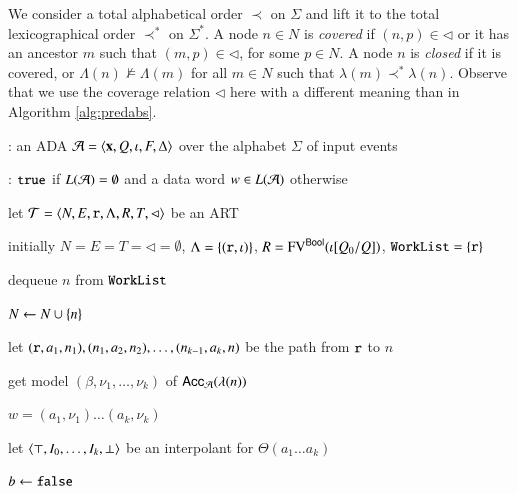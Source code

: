 \documentclass[10pt,conference,letterpaper,twocolumn]{IEEEtran}
\begin{document}
We consider a total alphabetical order $\prec$ on $\Sigma$ and lift it
to the total lexicographical order $\prec^*$ on $\Sigma^*$. A node $n
\in N$ is \emph{covered} if $(n,p) \in \lhd$ or it has an ancestor $m$
such that $(m,p) \in \lhd$, for some $p \in N$. A node $n$ is
\emph{closed} if it is covered, or $\Lambda(n) \not\models \Lambda(m)$
for all $m \in N$ such that $\lambda(m) \prec^* \lambda(n)$. Observe
that we use the coverage relation $\lhd$ here with a different meaning
than in Algorithm \ref{alg:predabs}.

\begin{algorithm}[t!]
{\scriptsize\begin{algorithmic}[0]
  : an ADA $\mathcal{A} = \left\langle \mathbf x,Q,\iota,F,\Delta \right\rangle$
  over the alphabet $\Sigma$ of input events

  : $\mathtt{true}$ if $L(\mathcal{A})=\emptyset$ and a data word $w
  \in L(\mathcal{A})$ otherwise
\end{algorithmic}}

{\scriptsize\begin{algorithmic}[1] 

  \State let $\mathcal{T} = \left\langle N,E,\mathtt{r},\Lambda,R,T,\lhd \right\rangle$ be an ART

  \State initially $N = E = T = \lhd = \emptyset$, $\Lambda =
  \left\{ (\mathtt{r},\iota) \right\}$, $R = \mathrm{FV}^{\mathsf{Bool}}(\iota[Q_0/Q])$,
  $\mathtt{WorkList}=\left\{ \mathtt{r} \right\}$
  
  \While{$\worklist \neq \emptyset$}
  \label{ln:impact-while}

  \State dequeue $n$ from $\mathtt{WorkList}$ 
  \label{ln:impact-dequeue}

  \State $N \leftarrow N \cup \left\{ n \right\}$

  \State let $(\mathtt{r},a_1,n_1),(n_1,a_2,n_2), \ldots,
  (n_{k-1},a_k,n)$ be the path from $\mathtt{r}$ to $n$


  \State get model $(\beta,\nu_1,\ldots,\nu_k)$ of
  $\mathsf{Acc}_{\mathcal{A}}(\lambda(n))$

   $w = (a_1,\nu_1) \ldots (a_k,\nu_k)$
  \label{ln:impact-nonempty}

  \Else {}

  \State let $\left\langle \top,I_0,\ldots,I_k,\bot \right\rangle$ be an interpolant for
  $\Theta(a_1 \ldots a_k)$
  \label{ln:refine-begin}

  \State $b \leftarrow \mathtt{false}$


\end{algorithmic}}
\end{algorithm}
\end{document}

